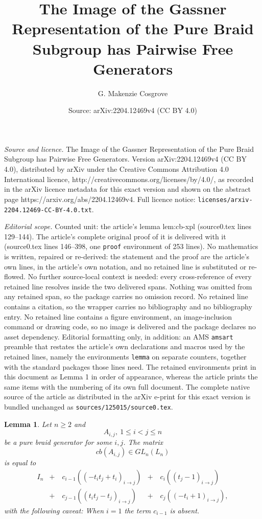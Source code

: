 \documentclass[10pt,a4paper]{amsart}
\title{The Image of the Gassner Representation of the Pure Braid Subgroup has Pairwise Free Generators}
\author{G. Makenzie Cosgrove}
\date{Source: arXiv:2204.12469v4 (CC BY 4.0)}
\newtheorem{lemma}{Lemma}
\begin{document}
\maketitle

\noindent\emph{Source and licence.} The Image of the Gassner Representation of the Pure Braid Subgroup has Pairwise Free Generators. Version arXiv:2204.12469v4 (CC BY 4.0), distributed by arXiv under the Creative Commons Attribution 4.0 International licence, http://creativecommons.org/licenses/by/4.0/, as recorded in the arXiv licence metadata for this exact version and shown on the abstract page https://arxiv.org/abs/2204.12469v4. Full licence notice: \texttt{licenses/arxiv-2204.12469-CC-BY-4.0.txt}.\par\smallskip

\noindent\textit{Editorial scope.} Counted unit: the article's lemma lem:cb-xpl (source0.tex lines 129--144). The article's complete original proof of it is delivered with it (source0.tex lines 146--398, one \texttt{proof} environment of 253 lines). No mathematics is written, repaired or re-derived: the statement and the proof are the article's own lines, in the article's own notation, and no retained line is substituted or re-flowed.  No further source-local context is needed: every cross-reference of every retained line resolves inside the two delivered spans.  Nothing was omitted from any retained span, so the package carries no omission record.  No retained line contains a citation, so the wrapper carries no bibliography and no bibliography entry.  No retained line contains a figure environment, an image-inclusion command or drawing code, so no image is delivered and the package declares no asset dependency.  Editorial formatting only, in addition: an AMS \texttt{amsart} preamble that restates the article's own declarations and macros used by the retained lines, namely the environments \texttt{lemma} on separate counters, together with the standard packages those lines need.  The retained environments print in this document as Lemma 1 in order of appearance, whereas the article prints the same items with the numbering of its own full document.  The complete native source of the article as distributed in the arXiv e-print for this exact version is bundled unchanged as \texttt{sources/125015/source0.tex}.
\begin{lemma}\label{lem:cb-xpl}
	Let $n\ge 2$ and
	\begin{equation*}
	A_{i,j},\ 1\le i<j\le n
	\end{equation*}
	be a pure braid generator for some $i,j$. The matrix
	\begin{equation*}
	cb(A_{i,j})\in GL_n(L_n)  
	\end{equation*}
	is equal to
	\begin{eqnarray*}
		I_n &+\quad c_{i-1}((-t_it_j+t_i)_{i\to j}) &+\quad c_i((t_j-1)_{i\to j})\\
		&+\quad c_{j-1}((t_it_j-t_j)_{i\to j}) &+\quad c_{j}((-t_i+1)_{i\to j}),
	\end{eqnarray*}
	with the following caveat: When $i=1$ the term $c_{i-1}$ is absent.
\end{lemma}
\end{document}
